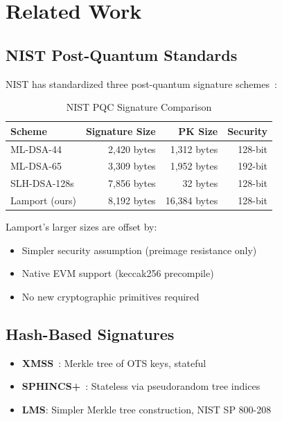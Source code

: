 \documentclass[11pt,a4paper]{article}
\begin{document}
\section{Related Work}

\subsection{NIST Post-Quantum Standards}

NIST has standardized three post-quantum signature schemes~\cite{nist2024}:

\begin{table}[h]
\centering
\caption{NIST PQC Signature Comparison}
\begin{tabular}{@{}lrrr@{}}
\toprule
Scheme & Signature Size & PK Size & Security \\
\midrule
ML-DSA-44 & 2,420 bytes & 1,312 bytes & 128-bit \\
ML-DSA-65 & 3,309 bytes & 1,952 bytes & 192-bit \\
SLH-DSA-128s & 7,856 bytes & 32 bytes & 128-bit \\
Lamport (ours) & 8,192 bytes & 16,384 bytes & 128-bit \\
\bottomrule
\end{tabular}
\end{table}

Lamport's larger sizes are offset by:
\begin{itemize}
    \item Simpler security assumption (preimage resistance only)
    \item Native EVM support (keccak256 precompile)
    \item No new cryptographic primitives required
\end{itemize}

\subsection{Hash-Based Signatures}

\begin{itemize}
    \item \textbf{XMSS}~\cite{buchmann2011}: Merkle tree of OTS keys, stateful
    \item \textbf{SPHINCS+}~\cite{bernstein2019}: Stateless via pseudorandom tree indices
    \item \textbf{LMS}: Simpler Merkle tree construction, NIST SP 800-208
\end{itemize}
\end{document}
